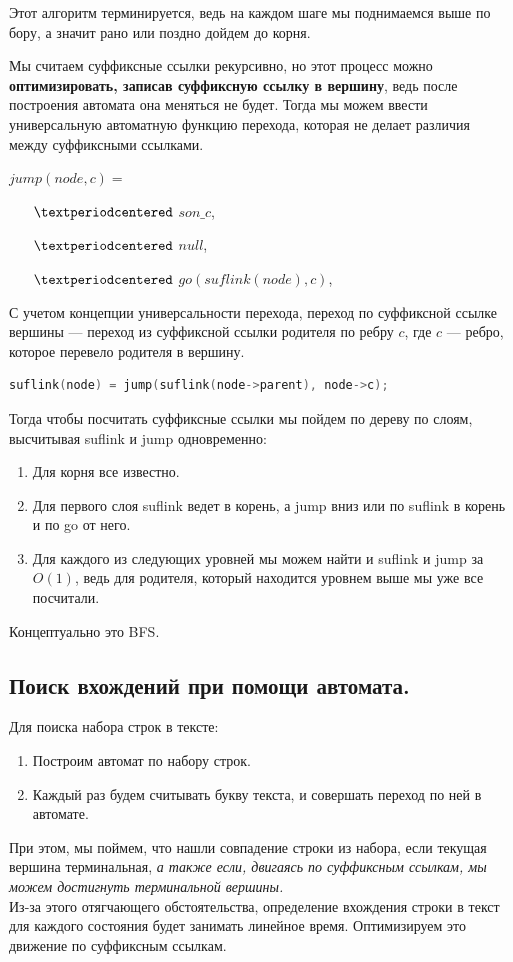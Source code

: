 Этот алгоритм терминируется, ведь на каждом шаге мы поднимаемся выше по бору, а значит рано или поздно дойдем до корня.

Мы считаем суффиксные ссылки рекурсивно, но этот процесс можно \textbf{оптимизировать, записав суффиксную ссылку в вершину}, ведь после построения автомата она меняться не будет.
Тогда мы можем ввести универсальную автоматную функцию перехода, которая не делает различия между суффиксными ссылками.

$jump(node, c) = $
\begin{itemize}
    \item[$\textperiodcentered$] $son\_c$, 
    \item[$\textperiodcentered$] $null$, 
    \item[$\textperiodcentered$] $go(suflink(node), c)$, 
\end{itemize}

С учетом концепции универсальности перехода, переход по суффиксной ссылке вершины --- переход из суффиксной ссылки родителя по ребру $c$, где  $c$ --- ребро, которое перевело родителя в вершину.
\begin{lstlisting}[language = C++]
    suflink(node) = jump(suflink(node->parent), node->c); 
\end{lstlisting}

Тогда чтобы посчитать суффиксные ссылки мы пойдем по дереву по слоям, высчитывая suflink и jump одновременно:
\begin{enumerate}
    \item Для корня все известно.
    \item Для первого слоя suflink ведет в корень, а jump вниз или по suflink в корень и по go от него.
    \item Для каждого из следующих уровней мы можем найти и suflink и jump за $O(1)$, ведь для родителя, который находится уровнем выше мы уже все посчитали.
\end{enumerate}
Концептуально это BFS.

\subsection{Поиск вхождений при помощи автомата.}
Для поиска набора строк в тексте:
\begin{enumerate}
    \item Построим автомат по набору строк. 
    \item Каждый раз будем считывать букву текста, и совершать переход по ней в автомате.
\end{enumerate}
При этом, мы поймем, что нашли совпадение строки из набора, если текущая вершина терминальная, \textit{а также если, двигаясь по суффиксным ссылкам, мы можем достигнуть терминальной вершины.} \\
Из-за этого отягчающего обстоятельства, определение вхождения строки в текст для каждого состояния будет занимать линейное время.
Оптимизируем это движение по суффиксным ссылкам.

